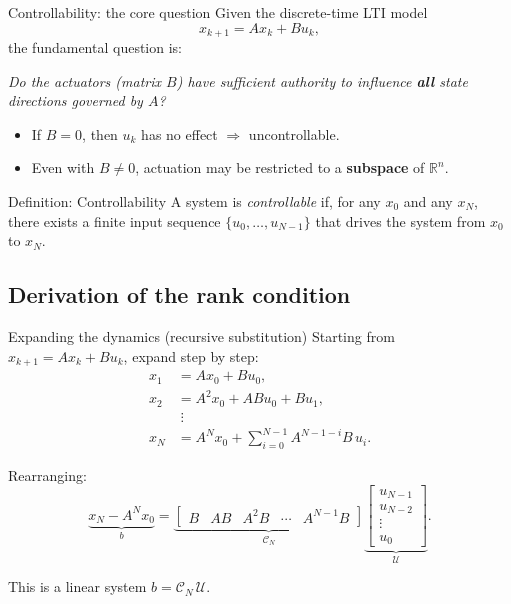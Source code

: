 \documentclass[aspectratio=169,10pt]{beamer}
\newcommand{\R}{\mathbb{R}}
\newcommand{\Ccal}{\mathcal{C}}
\begin{document}
\begin{frame}{Controllability: the core question}
Given the discrete-time LTI model
\[
x_{k+1}=Ax_k+Bu_k,
\]
the fundamental question is:

\begin{center}
\emph{Do the actuators (matrix $B$) have sufficient authority to influence
\textbf{all} state directions governed by $A$?}
\end{center}

\begin{itemize}
  \item If $B=0$, then $u_k$ has no effect $\Rightarrow$ uncontrollable.
  \item Even with $B\neq 0$, actuation may be restricted to a
        \textbf{subspace} of $\R^n$.
\end{itemize}

\begin{defnbox}{Definition: Controllability}
A system is \emph{controllable} if, for any $x_0$ and any $x_N$, there
exists a finite input sequence $\{u_0,\ldots,u_{N-1}\}$ that drives the
system from $x_0$ to $x_N$.
\end{defnbox}
\end{frame}

\subsection{Derivation of the rank condition}

\begin{frame}{Expanding the dynamics (recursive substitution)}
Starting from $x_{k+1}=Ax_k+Bu_k$, expand step by step:
\begin{align*}
x_1 &= Ax_0+Bu_0,\\
x_2 &= A^2x_0 + ABu_0 + Bu_1,\\
&\;\vdots\\
x_N &= A^N x_0 + \sum_{i=0}^{N-1} A^{N-1-i}B\,u_i.
\end{align*}

Rearranging:
\[
\underbrace{x_N - A^N x_0}_{b}
=
\underbrace{\begin{bmatrix}
B & AB & A^2B & \cdots & A^{N-1}B
\end{bmatrix}}_{\Ccal_N}
\underbrace{\begin{bmatrix}
u_{N-1}\\ u_{N-2}\\ \vdots\\ u_0
\end{bmatrix}}_{\mathcal{U}}.
\]

This is a linear system $b=\Ccal_N\,\mathcal{U}$.
\end{frame}
\end{document}
